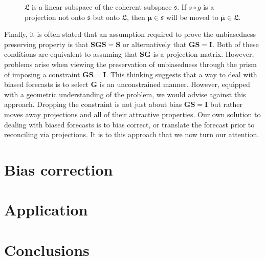 \documentclass[12pt]{article}
\theoremstyle{definition}
\theoremstyle{property}
\begin{document}
	\begin{figure}[H]
		\centering
		\vspace{-0.9cm}
		\small
		\resizebox{\linewidth}{!}{
			
		}
		\caption{$\mathfrak{L}$ is a linear subspace of the coherent subspace $\mathfrak{s}$. If $s\circ g$ is a projection not onto $\mathfrak{s}$ but onto $\mathfrak{L}$, then $\bm{\mu} \in \mathfrak{s}$ will be moved to $\bar{\bm{\mu}} \in \mathfrak{L}$.}\label{fig:Schematic_3D}
	\end{figure}
	
	Finally, it is often stated that an assumption required to prove the unbiasedness preserving property is that $\bm{SGS}=\bm{S}$ or alternatively that $\bm{GS}=\bm{I}$.  Both of these conditions are equivalent to assuming that $\bm{SG}$ is a projection matrix.    However, problems arise when viewing the preservation of unbiasedness through the prism of imposing a constraint $\bm{GS}=\bm{I}$. This thinking suggests that a way to deal with biased forecasts is to select $\bm{G}$ is an unconstrained manner.  However, equipped with a geometric understanding of the problem, we would advise against this approach.  Dropping the constraint is not just about bias $\bm{GS}=\bm{I}$ but rather moves away projections and all of their attractive properties.  Our own solution to dealing with biased forecasts is to bias correct, or translate the forecast prior to reconciling via projections.  It is to this approach that we now turn our attention.
	
	
	

	
	
	\section{Bias correction}
	
	\section{Application}
	
	\section{Conclusions}
	
	\newpage
	
	
	
	
	
\end{document}
